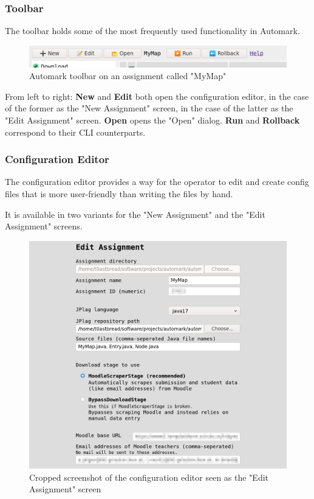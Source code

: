\documentclass[12pt,a4paper,oneside]{report}
\begin{document}
	\pagebreak
	\subsubsection{Toolbar}
	The toolbar holds some of the most frequently used functionality in Automark.

	\begin{figure}[H]
		\includegraphics[width=\textwidth]{automark_toolbar.png}
		\vskip0pt
		\caption{Automark toolbar on an assignment called "MyMap"}
	\end{figure}

	From left to right: \textbf{New} and \textbf{Edit} both open the configuration editor, in the case of the former as the "New Assignment" screen, in the case of the latter as the "Edit Assignment" screen. \textbf{Open} opens the "Open" dialog. \textbf{Run} and \textbf{Rollback} correspond to their CLI counterparts.

	\subsubsection{Configuration Editor}
	The configuration editor provides a way for the operator to edit and create config files that is more user-friendly than writing the files by hand.

	It is available in two variants for the "New Assignment" and the "Edit Assignment" screens.

	\begin{figure}[H]
		\centering
		\includegraphics[width=.9\textwidth]{automark_configuration_editor.png}
		\vskip0pt
		\caption{Cropped screenshot of the configuration editor seen as the "Edit Assignment" screen}
	\end{figure}
\end{document}
